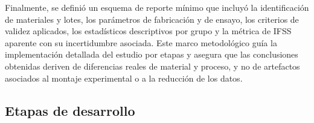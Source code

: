 Finalmente, se definió un esquema de reporte mínimo que incluyó la identificación de materiales
y lotes, los parámetros de fabricación y de ensayo, los criterios de validez aplicados, los
estadísticos descriptivos por grupo y la métrica de IFSS aparente con su incertidumbre
asociada. Este marco metodológico guía la implementación detallada del estudio por etapas y
asegura que las conclusiones obtenidas deriven de diferencias reales de material y proceso, y
no de artefactos asociados al montaje experimental o a la reducción de los datos.

\subsection{Etapas de desarrollo}





